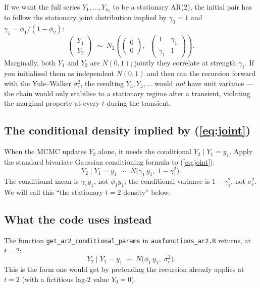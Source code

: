 \documentclass[11pt]{article}
\newcommand{\eref}[1]{(\ref{#1})}
\theoremstyle{plain}
\theoremstyle{definition}
\theoremstyle{remark}
\begin{document}
If we want the full series $Y_1, \ldots, Y_{n_t}$ to be a stationary AR(2),
the initial pair has to follow the stationary joint distribution implied
by $\gamma_0 = 1$ and $\gamma_1 = \phi_1/(1-\phi_2)$:
\begin{equation}\label{eq:joint}
  \boxed{\;
  \begin{pmatrix} Y_1 \\ Y_2 \end{pmatrix}
  \;\sim\;
  N_2\!\left(
    \begin{pmatrix} 0 \\ 0 \end{pmatrix},\;\;
    \begin{pmatrix} 1 & \gamma_1 \\ \gamma_1 & 1 \end{pmatrix}
  \right).
  \;}
\end{equation}
Marginally, both $Y_1$ and $Y_2$ are $N(0, 1)$; jointly they correlate at
strength $\gamma_1$. If you initialised them as independent $N(0, 1)$ and
then ran the recursion forward with the Yule--Walker $\sigma_\epsilon^2$,
the resulting $Y_3, Y_4, \ldots$ would \emph{not} have unit variance --- the
chain would only stabilise to a stationary regime after a transient,
violating the marginal property at every $t$ during the transient.

\subsection{The conditional density implied by \eref{eq:joint}}\label{sec:cond}

When the MCMC updates $Y_2$ alone, it needs the conditional $Y_2 \mid Y_1
= y_1$. Apply the standard bivariate Gaussian conditioning formula to
\eref{eq:joint}:
\begin{equation}\label{eq:p2-stationary}
  \boxed{\;
  Y_2 \mid Y_1 = y_1 \;\sim\; N\bigl(\gamma_1\, y_1,\; 1 - \gamma_1^2\bigr).
  \;}
\end{equation}
The conditional mean is $\gamma_1 y_1$, not $\phi_1 y_1$; the conditional
variance is $1 - \gamma_1^2$, not $\sigma_\epsilon^2$. We will call this
``the stationary $t=2$ density'' below.

\subsection{What the code uses instead}\label{sec:code-t2}

The function \texttt{get\_ar2\_conditional\_params} in
\texttt{auxfunctions\_ar2.R} returns, at $t = 2$:
\begin{equation}\label{eq:p2-code}
  Y_2 \mid Y_1 = y_1 \;\sim\; N\bigl(\phi_1\, y_1,\; \sigma_\epsilon^2\bigr).
\end{equation}
This is the form one would get by pretending the recursion already
applies at $t = 2$ (with a fictitious lag-2 value $Y_0 = 0$).
\end{document}
